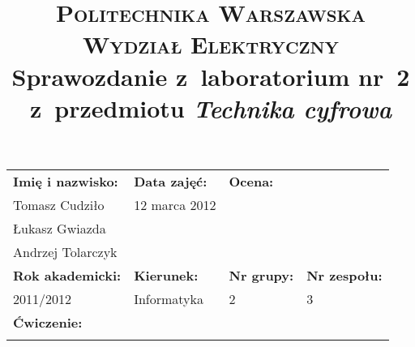 \documentclass[10pt,a4paper]{article}
\begin{document}
\title{
  \textsc{Politechnika Warszawska}\\
  \textsc{Wydział Elektryczny}\\[18pt]
  Sprawozdanie z~laboratorium nr~2\\z~przedmiotu \emph{Technika cyfrowa}
}
\date{}
\maketitle

\begin{tabular*}{\textwidth}{@{\extracolsep{\fill}}llll}
  \toprule
  \multicolumn{1}{l}{\bf Imię i nazwisko: } & \multicolumn{1}{l}{\bf Data zajęć: } & \multicolumn{2}{l}{ \bf Ocena: } \\
  \multicolumn{1}{l}{Tomasz Cudziło} & \multicolumn{1}{l}{12 marca 2012} & & \\
  \multicolumn{1}{l}{Łukasz Gwiazda} & & & \\
  \multicolumn{1}{l}{Andrzej Tolarczyk} & & & \\
  \midrule
  \multicolumn{1}{l}{\bf{Rok akademicki: }} & \bf{Kierunek: } & \bf{Nr grupy: } & \bf{Nr zespołu: } \\
  \multicolumn{1}{l}{2011/2012} & Informatyka & 2 & 3 \\
  \midrule
  \multicolumn{4}{l}{\bf{Ćwiczenie: }} \\
  \multicolumn{4}{l}{} \\
  \bottomrule
\end{tabular*}
\pagebreak
\end{document}
